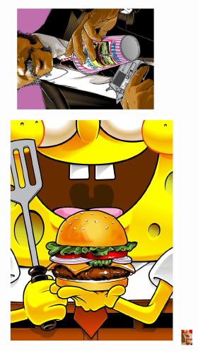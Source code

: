 \documentclass[12pt, a4paper]{article}
\begin{document}
\begin{figure}[h!]

\begin{minipage}[h!]{0.3\linewidth} 
\includegraphics[height=4cm,width=6cm,keepaspectratio,scale=0.15,angle=270]{pop1.pdf}
\end{minipage}
\hfill
\begin{minipage}[h!]{0.3\linewidth}
\includegraphics[scale=0.975]{pop8.pdf}
\end{minipage}
\hfill
\begin{minipage}[h!]{0.3\linewidth}
\includegraphics[scale=14.855]{pop3.pdf}
\end{minipage}
\hfill
\begin{minipage}[h!]{0.3\linewidth}

\end{minipage}
\end{figure}
\end{document}
